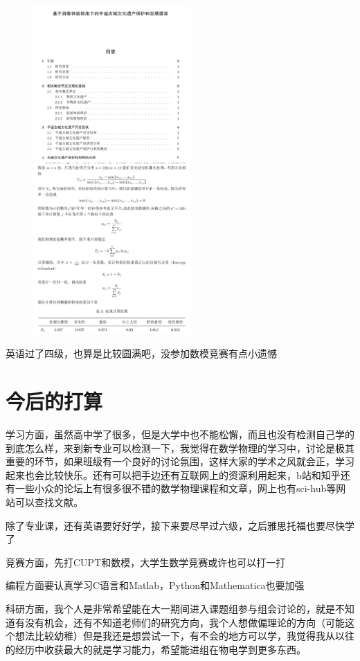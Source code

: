 \documentclass[hyperref,UTF8]{ctexart}
\begin{document}
\begin{figure}[H]
    \centering
    \includegraphics[width=6cm]{屏幕截图 2021-09-07 152214.png}
    \includegraphics[width=6cm]{屏幕截图 2021-09-07 152300.png}
\end{figure}
英语过了四级，也算是比较圆满吧，没参加数模竞赛有点小遗憾
\part{今后的打算}
学习方面，虽然高中学了很多，但是大学中也不能松懈，而且也没有检测自己学的到底怎么样，来到新专业可以检测一下，我觉得在数学物理的学习中，讨论是极其重要的环节，如果班级有一个良好的讨论氛围，这样大家的学术之风就会正，学习起来也会比较快乐。还有可以把手边还有互联网上的资源利用起来，b站和知乎还有一些小众的论坛上有很多很不错的数学物理课程和文章，网上也有sci-hub等网站可以查找文献。

除了专业课，还有英语要好好学，接下来要尽早过六级，之后雅思托福也要尽快学了

竞赛方面，先打CUPT和数模，大学生数学竞赛或许也可以打一打

编程方面要认真学习C语言和Matlab，Python和Mathematica也要加强

科研方面，我个人是非常希望能在大一期间进入课题组参与组会讨论的，就是不知道有没有机会，还有不知道老师们的研究方向，我个人想做偏理论的方向（可能这个想法比较幼稚）但是我还是想尝试一下，有不会的地方可以学，我觉得我从以往的经历中收获最大的就是学习能力，希望能进组在物电学到更多东西。
\end{document}
